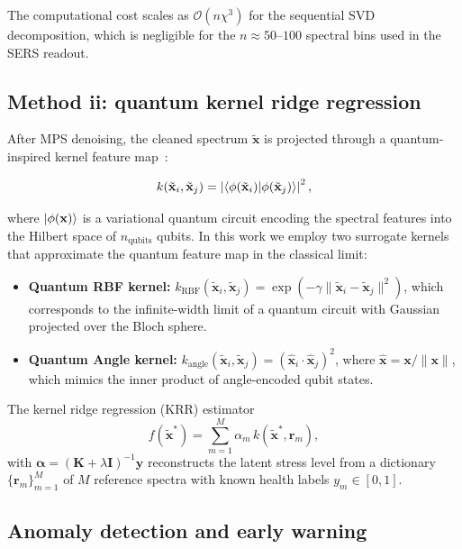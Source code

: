 \documentclass[11pt,a4paper]{article}
\begin{document}
The computational cost scales as $\mathcal{O}(n \chi^3)$ for the sequential SVD decomposition, which is negligible for the $n \approx 50$--$100$ spectral bins used in the SERS readout.

\subsection{Method ii: quantum kernel ridge regression}

After MPS denoising, the cleaned spectrum $\tilde{\mathbf{x}}$ is projected through a quantum-inspired kernel feature map~\cite{Havlicek2019}:

\begin{equation}
k(\tilde{\mathbf{x}}_i, \tilde{\mathbf{x}}_j) = \left| \braket{\phi(\tilde{\mathbf{x}}_i)}{\phi(\tilde{\mathbf{x}}_j)} \right|^2,
\label{eq:SI_quantum_kernel}
\end{equation}

where $\ket{\phi(\mathbf{x})}$ is a variational quantum circuit encoding the spectral features into the Hilbert space of $n_{\mathrm{qubits}}$ qubits. In this work we employ two surrogate kernels that approximate the quantum feature map in the classical limit:

\begin{itemize}
\item \textbf{Quantum RBF kernel:} $k_{\mathrm{RBF}}(\tilde{\mathbf{x}}_i, \tilde{\mathbf{x}}_j) = \exp(-\gamma \|\tilde{\mathbf{x}}_i - \tilde{\mathbf{x}}_j\|^2)$, which corresponds to the infinite-width limit of a quantum circuit with Gaussian projected over the Bloch sphere.
\item \textbf{Quantum Angle kernel:} $k_{\mathrm{angle}}(\tilde{\mathbf{x}}_i, \tilde{\mathbf{x}}_j) = (\hat{\mathbf{x}}_i \cdot \hat{\mathbf{x}}_j)^2$, where $\hat{\mathbf{x}} = \mathbf{x} / \|\mathbf{x}\|$, which mimics the inner product of angle-encoded qubit states.
\end{itemize}

The kernel ridge regression (KRR) estimator
\begin{equation}
f(\tilde{\mathbf{x}}^*) = \sum_{m=1}^{M} \alpha_m\, k(\tilde{\mathbf{x}}^*, \mathbf{r}_m),
\label{eq:SI_krr}
\end{equation}
with $\boldsymbol{\alpha} = (\mathbf{K} + \lambda \mathbf{I})^{-1} \mathbf{y}$ reconstructs the latent stress level from a dictionary $\{\mathbf{r}_m\}_{m=1}^M$ of $M$ reference spectra with known health labels $y_m \in [0, 1]$.

\subsection{Anomaly detection and early warning}
\end{document}
